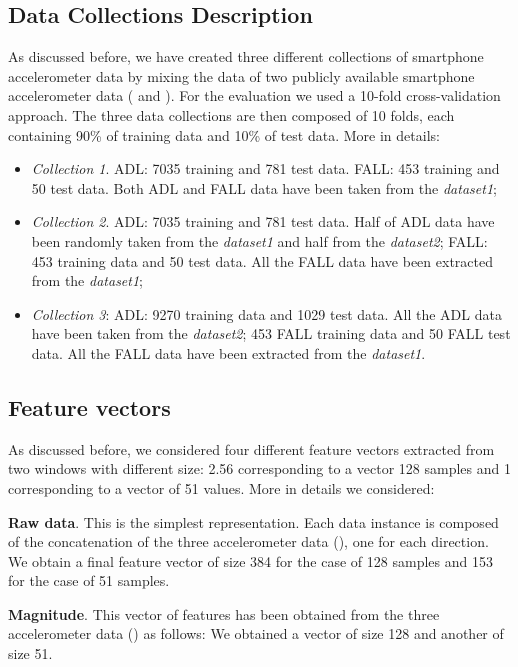 \documentclass[twocolumn]{svjour3}          \smartqed  \usepackage[draft]{hyperref}
\begin{document}
\subsection{Data Collections Description}
As discussed before, we have created three different collections of smartphone accelerometer data by mixing the data of two publicly available smartphone accelerometer data (\citet{medrano2014} and \citet{anguita2013public}). For the evaluation we used a 10-fold cross-validation approach. The three data collections are then composed of 10 folds, each containing 90\% of training data and 10\% of test data. More in details:
\begin{itemize}
\item \emph{Collection 1}. ADL: 7035 training and 781 test data. FALL: 453 training and 50 test data.  Both ADL and FALL data have been taken from the \emph{dataset1};
\item \emph{Collection 2}. ADL: 7035 training and 781 test data. Half of ADL data have been randomly taken from the \emph{dataset1} and half from  the \emph{dataset2};  FALL: 453 training data and 50 test data.  All the FALL data have been extracted from the  \emph{dataset1};
\item \emph{Collection 3}: ADL: 9270 training data and 1029 test data. All the ADL data have been taken from the \emph{dataset2}; 453 FALL training data and 50 FALL test data.  All the FALL data have been extracted from the  \emph{dataset1}.
\end{itemize}

\subsection{Feature vectors}

As discussed before, we considered four different feature vectors extracted from two windows with different size: 2.56  corresponding to a vector 128 samples and 1  corresponding to a vector of 51 values. More in details we considered:

\noindent \textbf{Raw data}. This is the simplest representation. Each data instance is composed of the concatenation of the three accelerometer data (), one for each direction. We obtain a final feature vector of size 384 for the case of 128 samples and 153 for the case of 51 samples.

\noindent \textbf{Magnitude}. This vector of features has been obtained from the three accelerometer data () as follows:  We obtained a vector of size 128 and another of size 51.
\end{document}
